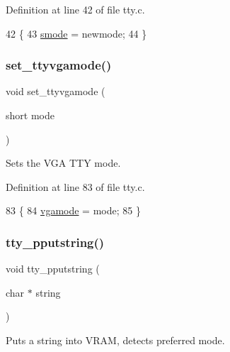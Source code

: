 Definition at line 42 of file tty.\+c.


\begin{DoxyCode}
42                                   \{
43     \hyperlink{a00179_a22b8d30f7aee33f172c1239aed53e7db_a22b8d30f7aee33f172c1239aed53e7db}{smode} = newmode;
44 \}
\end{DoxyCode}
\mbox{\label{a00179_aaf55ee008e2e63ca97eacae371646db7_aaf55ee008e2e63ca97eacae371646db7}} 
\subsubsection{\texorpdfstring{set\+\_\+ttyvgamode()}{set\_ttyvgamode()}}
{\footnotesize\ttfamily void set\+\_\+ttyvgamode (\begin{DoxyParamCaption}\item[{short}]{mode }\end{DoxyParamCaption})}



Sets the V\+GA T\+TY mode. 



Definition at line 83 of file tty.\+c.


\begin{DoxyCode}
83                                 \{
84     \hyperlink{a00179_af93b0649fdd1bea5b6d29ed37205aa2c_af93b0649fdd1bea5b6d29ed37205aa2c}{vgamode} = mode;
85 \}
\end{DoxyCode}
\mbox{\label{a00179_ade960b1320324706aac6c00cc6b1b2fe_ade960b1320324706aac6c00cc6b1b2fe}} 
\subsubsection{\texorpdfstring{tty\+\_\+pputstring()}{tty\_pputstring()}}
{\footnotesize\ttfamily void tty\+\_\+pputstring (\begin{DoxyParamCaption}\item[{char $\ast$}]{string }\end{DoxyParamCaption})}



Puts a string into V\+R\+AM, detects preferred mode. 


